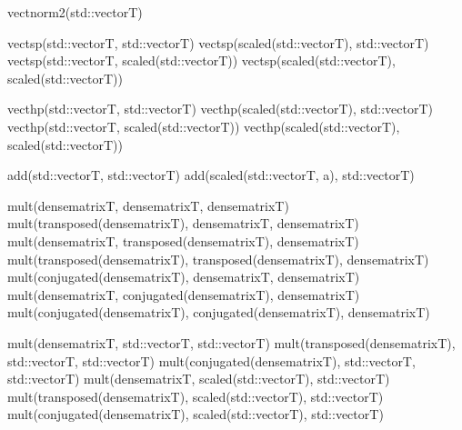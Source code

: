 \documentclass[a4paper,11pt,english]{sphinxmanual}
\begin{document}
\begin{sphinxVerbatim}[commandchars=\\\{\}]
vect\PYGZus{}norm2(std::vector\PYGZlt{}T\PYGZgt{})

vect\PYGZus{}sp(std::vector\PYGZlt{}T\PYGZgt{}, std::vector\PYGZlt{}T\PYGZgt{})
vect\PYGZus{}sp(scaled(std::vector\PYGZlt{}T\PYGZgt{}), std::vector\PYGZlt{}T\PYGZgt{})
vect\PYGZus{}sp(std::vector\PYGZlt{}T\PYGZgt{}, scaled(std::vector\PYGZlt{}T\PYGZgt{}))
vect\PYGZus{}sp(scaled(std::vector\PYGZlt{}T\PYGZgt{}), scaled(std::vector\PYGZlt{}T\PYGZgt{}))

vect\PYGZus{}hp(std::vector\PYGZlt{}T\PYGZgt{}, std::vector\PYGZlt{}T\PYGZgt{})
vect\PYGZus{}hp(scaled(std::vector\PYGZlt{}T\PYGZgt{}), std::vector\PYGZlt{}T\PYGZgt{})
vect\PYGZus{}hp(std::vector\PYGZlt{}T\PYGZgt{}, scaled(std::vector\PYGZlt{}T\PYGZgt{}))
vect\PYGZus{}hp(scaled(std::vector\PYGZlt{}T\PYGZgt{}), scaled(std::vector\PYGZlt{}T\PYGZgt{}))

add(std::vector\PYGZlt{}T\PYGZgt{}, std::vector\PYGZlt{}T\PYGZgt{})
add(scaled(std::vector\PYGZlt{}T\PYGZgt{}, a), std::vector\PYGZlt{}T\PYGZgt{})

mult(dense\PYGZus{}matrix\PYGZlt{}T\PYGZgt{}, dense\PYGZus{}matrix\PYGZlt{}T\PYGZgt{}, dense\PYGZus{}matrix\PYGZlt{}T\PYGZgt{})
mult(transposed(dense\PYGZus{}matrix\PYGZlt{}T\PYGZgt{}), dense\PYGZus{}matrix\PYGZlt{}T\PYGZgt{}, dense\PYGZus{}matrix\PYGZlt{}T\PYGZgt{})
mult(dense\PYGZus{}matrix\PYGZlt{}T\PYGZgt{}, transposed(dense\PYGZus{}matrix\PYGZlt{}T\PYGZgt{}), dense\PYGZus{}matrix\PYGZlt{}T\PYGZgt{})
mult(transposed(dense\PYGZus{}matrix\PYGZlt{}T\PYGZgt{}), transposed(dense\PYGZus{}matrix\PYGZlt{}T\PYGZgt{}),
     dense\PYGZus{}matrix\PYGZlt{}T\PYGZgt{})
mult(conjugated(dense\PYGZus{}matrix\PYGZlt{}T\PYGZgt{}), dense\PYGZus{}matrix\PYGZlt{}T\PYGZgt{}, dense\PYGZus{}matrix\PYGZlt{}T\PYGZgt{})
mult(dense\PYGZus{}matrix\PYGZlt{}T\PYGZgt{}, conjugated(dense\PYGZus{}matrix\PYGZlt{}T\PYGZgt{}), dense\PYGZus{}matrix\PYGZlt{}T\PYGZgt{})
mult(conjugated(dense\PYGZus{}matrix\PYGZlt{}T\PYGZgt{}), conjugated(dense\PYGZus{}matrix\PYGZlt{}T\PYGZgt{}),
     dense\PYGZus{}matrix\PYGZlt{}T\PYGZgt{})

mult(dense\PYGZus{}matrix\PYGZlt{}T\PYGZgt{}, std::vector\PYGZlt{}T\PYGZgt{}, std::vector\PYGZlt{}T\PYGZgt{})
mult(transposed(dense\PYGZus{}matrix\PYGZlt{}T\PYGZgt{}), std::vector\PYGZlt{}T\PYGZgt{}, std::vector\PYGZlt{}T\PYGZgt{})
mult(conjugated(dense\PYGZus{}matrix\PYGZlt{}T\PYGZgt{}), std::vector\PYGZlt{}T\PYGZgt{}, std::vector\PYGZlt{}T\PYGZgt{})
mult(dense\PYGZus{}matrix\PYGZlt{}T\PYGZgt{}, scaled(std::vector\PYGZlt{}T\PYGZgt{}), std::vector\PYGZlt{}T\PYGZgt{})
mult(transposed(dense\PYGZus{}matrix\PYGZlt{}T\PYGZgt{}), scaled(std::vector\PYGZlt{}T\PYGZgt{}),
     std::vector\PYGZlt{}T\PYGZgt{})
mult(conjugated(dense\PYGZus{}matrix\PYGZlt{}T\PYGZgt{}), scaled(std::vector\PYGZlt{}T\PYGZgt{}),
     std::vector\PYGZlt{}T\PYGZgt{})


\end{sphinxVerbatim}
\end{document}
